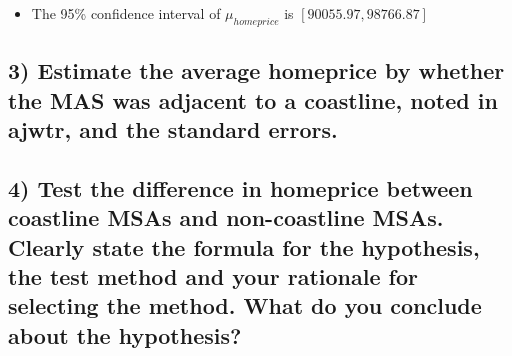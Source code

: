 \documentclass[
  12pt,
]{article}
\newenvironment{Shaded}{\begin{snugshade}}{\end{snugshade}}
\newcommand{\CommentTok}[1]{\textcolor[rgb]{0.56,0.35,0.01}{\textit{#1}}}
\newcommand{\DecValTok}[1]{\textcolor[rgb]{0.00,0.00,0.81}{#1}}
\newcommand{\FunctionTok}[1]{\textcolor[rgb]{0.00,0.00,0.00}{#1}}
\newcommand{\NormalTok}[1]{#1}
\newcommand{\OtherTok}[1]{\textcolor[rgb]{0.56,0.35,0.01}{#1}}
\newcommand{\SpecialCharTok}[1]{\textcolor[rgb]{0.00,0.00,0.00}{#1}}
\providecommand{\tightlist}{%
  \setlength{\itemsep}{0pt}\setlength{\parskip}{0pt}}
\begin{document}
\begin{itemize}
\tightlist
\item
  The 95\% confidence interval of \(\mu_{homeprice}\) is
  \([90055.97, 98766.87]\)\\
\end{itemize}

\hypertarget{estimate-the-average-homeprice-by-whether-the-mas-was-adjacent-to-a-coastline-noted-in-ajwtr-and-the-standard-errors.}{%
\subsection{3) Estimate the average homeprice by whether the MAS was
adjacent to a coastline, noted in ajwtr, and the standard
errors.}\label{estimate-the-average-homeprice-by-whether-the-mas-was-adjacent-to-a-coastline-noted-in-ajwtr-and-the-standard-errors.}}

\begin{Shaded}
\end{Shaded}

\hypertarget{test-the-difference-in-homeprice-between-coastline-msas-and-non-coastline-msas.-clearly-state-the-formula-for-the-hypothesis-the-test-method-and-your-rationale-for-selecting-the-method.-what-do-you-conclude-about-the-hypothesis}{%
\subsection{4) Test the difference in homeprice between coastline MSAs
and non-coastline MSAs. Clearly state the formula for the hypothesis,
the test method and your rationale for selecting the method. What do you
conclude about the
hypothesis?}\label{test-the-difference-in-homeprice-between-coastline-msas-and-non-coastline-msas.-clearly-state-the-formula-for-the-hypothesis-the-test-method-and-your-rationale-for-selecting-the-method.-what-do-you-conclude-about-the-hypothesis}}
\end{document}
